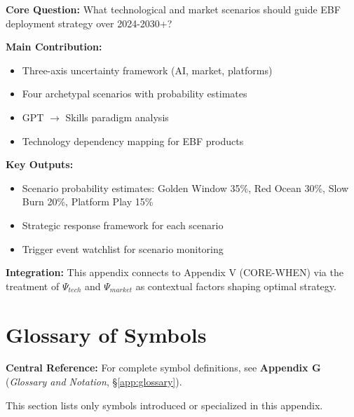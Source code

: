 \begin{tcolorbox}[colback=green!10!white, colframe=green!75!black,
    title=\textbf{Appendix VVV.1: Summary}]

\textbf{Core Question:} What technological and market scenarios should guide
EBF deployment strategy over 2024-2030+?

\textbf{Main Contribution:}
\begin{itemize}[nosep]
    \item Three-axis uncertainty framework (AI, market, platforms)
    \item Four archetypal scenarios with probability estimates
    \item GPT $\to$ Skills paradigm analysis
    \item Technology dependency mapping for EBF products
\end{itemize}

\textbf{Key Outputs:}
\begin{itemize}[nosep]
    \item Scenario probability estimates: Golden Window 35\%, Red Ocean 30\%,
          Slow Burn 20\%, Platform Play 15\%
    \item Strategic response framework for each scenario
    \item Trigger event watchlist for scenario monitoring
\end{itemize}

\textbf{Integration:} This appendix connects to Appendix V (CORE-WHEN) via
the treatment of $\Psi_{tech}$ and $\Psi_{market}$ as contextual factors
shaping optimal strategy.

\end{tcolorbox}


\section{Glossary of Symbols}
\label{sec:vvv1-glossary}

\begin{tcolorbox}[colback=blue!5!white, colframe=blue!75!black]
\textbf{Central Reference:} For complete symbol definitions, see
\textbf{Appendix G} (\textit{Glossary and Notation}, \S\ref{app:glossary}).

This section lists only symbols introduced or specialized in this appendix.
\end{tcolorbox}

